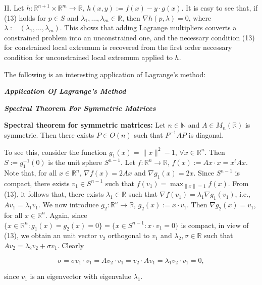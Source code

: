 \documentclass{book}
\begin{document}
II. Let $h : \mathbb{R}^{n+1} \times \mathbb{R}^m \to \mathbb{R}$, $h(x, y) := f(x) - y \cdot g(x)$. It is easy to see that, if (13) holds for $p \in S$ and $\lambda_1, \ldots, \lambda_m \in \mathbb{R}$, then $\nabla h(p, \lambda) = 0$, where $\lambda := (\lambda_1, \ldots, \lambda_m)$. This shows that adding Lagrange multipliers converts a constrained problem into an unconstrained one, and the necessary condition (13) for constrained local extremum is recovered from the first order necessary condition for unconstrained local extremum applied to $h$.

The following is an interesting application of Lagrange's method:

\begin{center}
    \textbf{\textit{Application Of Lagrange's Method}}
\end{center}

\begin{center}
    \textbf{\textit{Spectral Theorem For Symmetric Matrices}}
\end{center}

\textbf{Spectral theorem for symmetric matrices:} Let $n \in \mathbb{N}$ and $A \in M_n(\mathbb{R})$ is symmetric. Then there exists $P \in O(n)$ such that $P^{-1} A P$ is diagonal.

To see this, consider the function $g_1(x) = \|x\|^2 - 1$, $\forall x \in \mathbb{R}^n$. Then $S := g_1^{-1}(0)$ is the unit sphere $S^{n-1}$. Let $f : \mathbb{R}^n \to \mathbb{R}$, $f(x) := Ax \cdot x = x^t A x$. Note that, for all $x \in \mathbb{R}^n$, $\nabla f(x) = 2Ax$ and $\nabla g_1(x) = 2x$. Since $S^{n-1}$ is compact, there exists $v_1 \in S^{n-1}$ such that $f(v_1) = \max_{\|x\|=1} f(x)$. From (13), it follows that, there exists $\lambda_1 \in \mathbb{R}$ such that $\nabla f(v_1) = \lambda_1 \nabla g_1(v_1)$, i.e., $Av_1 = \lambda_1 v_1$. We now introduce $g_2 : \mathbb{R}^n \to \mathbb{R}$, $g_2(x) := x \cdot v_1$. Then $\nabla g_2(x) = v_1$, for all $x \in \mathbb{R}^n$. Again, since $\{x \in \mathbb{R}^n : g_1(x) = g_2(x) = 0\} = \{x \in S^{n-1} : x \cdot v_1 = 0\}$ is compact, in view of (13), we obtain an unit vector $v_2$ orthogonal to $v_1$ and $\lambda_2, \sigma \in \mathbb{R}$ such that $Av_2 = \lambda_2 v_2 + \sigma v_1$. Clearly

\[
\sigma = \sigma v_1 \cdot v_1 = Av_2 \cdot v_1 = v_2 \cdot Av_1 = \lambda_1 v_2 \cdot v_1 = 0,
\]

since $v_1$ is an eigenvector with eigenvalue $\lambda_1$.
\end{document}
